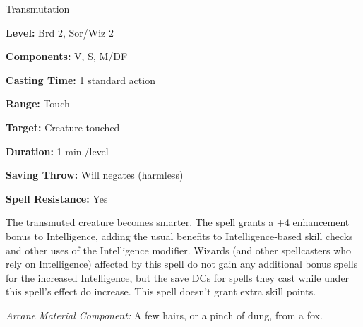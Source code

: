 
Transmutation

\textbf{Level:} Brd 2, Sor/Wiz 2

\textbf{Components:} V, S, M/DF

\textbf{Casting Time:} 1 standard action

\textbf{Range:} Touch

\textbf{Target:} Creature touched

\textbf{Duration:} 1 min./level

\textbf{Saving Throw:} Will negates (harmless)

\textbf{Spell Resistance:} Yes

The transmuted creature becomes smarter. The spell grants a +4 enhancement bonus 
to Intelligence, adding the usual benefits to Intelligence-based skill checks and 
other uses of the Intelligence modifier. Wizards (and other spellcasters who rely 
on Intelligence) affected by this spell do not gain any additional bonus spells 
for the increased Intelligence, but the save DCs for spells they cast while under 
this spell's effect do increase. This spell doesn't grant extra skill points.

\textit{Arcane Material Component:} A few hairs, or a pinch of dung, from a fox.


